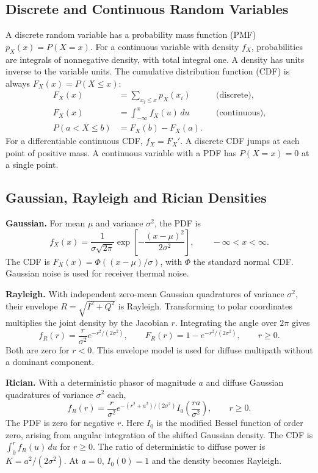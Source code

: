 \documentclass[12pt,a4paper]{article}
\begin{document}
\subsection{Discrete and Continuous Random Variables}
A discrete random variable has a probability mass function (PMF) $p_X(x)=P(X=x)$. For a continuous variable with density $f_X$, probabilities are integrals of nonnegative density, with total integral one. A density has units inverse to the variable units. The cumulative distribution function (CDF) is always $F_X(x)=P(X\le x)$:
\[
 \begin{aligned}
 F_X(x)&=\sum_{x_i\le x}p_X(x_i) && \text{(discrete)},\\
 F_X(x)&=\int_{-\infty}^{x}f_X(u)\,du && \text{(continuous)},\\
 P(a<X\le b)&=F_X(b)-F_X(a).
 \end{aligned}
\]
For a differentiable continuous CDF, $f_X=F_X'$. A discrete CDF jumps at each point of positive mass. A continuous variable with a PDF has $P(X=x)=0$ at a single point.

\subsection{Gaussian, Rayleigh and Rician Densities}
\begin{tcolorbox}[formulabox, title={Three Communication Distributions}]
\textbf{Gaussian.} For mean $\mu$ and variance $\sigma^2$, the PDF is
\[
 f_X(x)=\frac{1}{\sigma\sqrt{2\pi}}\exp\!\left[-\frac{(x-\mu)^2}{2\sigma^2}\right],
 \qquad -\infty<x<\infty.
\]
The CDF is $F_X(x)=\Phi((x-\mu)/\sigma)$, with $\Phi$ the standard normal CDF. Gaussian noise is used for receiver thermal noise.

\textbf{Rayleigh.} With independent zero-mean Gaussian quadratures of variance $\sigma^2$, their envelope $R=\sqrt{I^2+Q^2}$ is Rayleigh. Transforming to polar coordinates multiplies the joint density by the Jacobian $r$. Integrating the angle over $2\pi$ gives
\[
 f_R(r)=\frac{r}{\sigma^2}e^{-r^2/(2\sigma^2)},\qquad
 F_R(r)=1-e^{-r^2/(2\sigma^2)},\qquad r\ge0.
\]
Both are zero for $r<0$. This envelope model is used for diffuse multipath without a dominant component.

\textbf{Rician.} With a deterministic phasor of magnitude $a$ and diffuse Gaussian quadratures of variance $\sigma^2$ each,
\[
 f_R(r)=\frac{r}{\sigma^2}
        e^{-(r^2+a^2)/(2\sigma^2)} I_0\!\left(\frac{ra}{\sigma^2}\right),
        \qquad r\ge0.
\]
The PDF is zero for negative $r$. Here $I_0$ is the modified Bessel function of order zero, arising from angular integration of the shifted Gaussian density. The CDF is $\int_0^r f_R(u)\,du$ for $r\ge0$. The ratio of deterministic to diffuse power is $K=a^2/(2\sigma^2)$. At $a=0$, $I_0(0)=1$ and the density becomes Rayleigh.
\end{tcolorbox}
\end{document}
